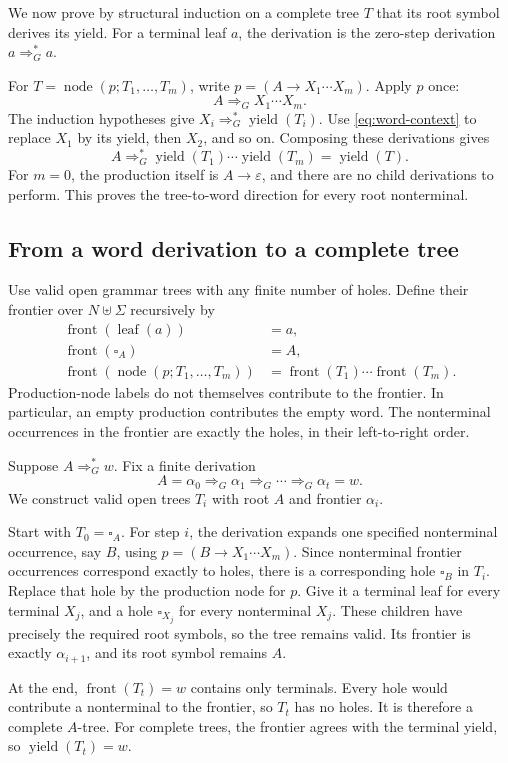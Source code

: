 \documentclass[11pt,a4paper]{article}
\numberwithin{equation}{section}
\theoremstyle{plain}
\theoremstyle{definition}
\theoremstyle{remark}
\newcommand{\eps}{\varepsilon}
\newcommand{\yield}{\operatorname{yield}}
\newcommand{\front}{\operatorname{front}}
\newcommand{\hole}[1]{\square_{#1}}
\begin{document}
We now prove by structural induction on a complete tree $T$ that its root symbol derives its yield. For a terminal leaf $a$, the derivation is the zero-step derivation $a\Rightarrow_G^*a$.

For $T=\operatorname{node}(p;T_1,\ldots,T_m)$, write $p=(A\to X_1\cdots X_m)$. Apply $p$ once:
\[
A\Rightarrow_G X_1\cdots X_m.
\]
The induction hypotheses give $X_i\Rightarrow_G^*\yield(T_i)$. Use \eqref{eq:word-context} to replace $X_1$ by its yield, then $X_2$, and so on. Composing these derivations gives
\[
A\Rightarrow_G^*\yield(T_1)\cdots\yield(T_m)=\yield(T).
\]
For $m=0$, the production itself is $A\to\eps$, and there are no child derivations to perform. This proves the tree-to-word direction for every root nonterminal.

\subsection{From a word derivation to a complete tree}
Use valid open grammar trees with any finite number of holes. Define their frontier over $N\uplus\Sigma$ recursively by
\begin{align*}
\front(\operatorname{leaf}(a))&=a,\\
\front(\hole A)&=A,\\
\front(\operatorname{node}(p;T_1,\ldots,T_m))
 &=\front(T_1)\cdots\front(T_m).
\end{align*}
Production-node labels do not themselves contribute to the frontier. In particular, an empty production contributes the empty word. The nonterminal occurrences in the frontier are exactly the holes, in their left-to-right order.

Suppose $A\Rightarrow_G^*w$. Fix a finite derivation
\[
A=\alpha_0\Rightarrow_G\alpha_1\Rightarrow_G\cdots
\Rightarrow_G\alpha_t=w.
\]
We construct valid open trees $T_i$ with root $A$ and frontier $\alpha_i$.

Start with $T_0=\hole A$. For step $i$, the derivation expands one specified nonterminal occurrence, say $B$, using $p=(B\to X_1\cdots X_m)$. Since nonterminal frontier occurrences correspond exactly to holes, there is a corresponding hole $\hole B$ in $T_i$. Replace that hole by the production node for $p$. Give it a terminal leaf for every terminal $X_j$, and a hole $\hole{X_j}$ for every nonterminal $X_j$. These children have precisely the required root symbols, so the tree remains valid. Its frontier is exactly $\alpha_{i+1}$, and its root symbol remains $A$.

At the end, $\front(T_t)=w$ contains only terminals. Every hole would contribute a nonterminal to the frontier, so $T_t$ has no holes. It is therefore a complete $A$-tree. For complete trees, the frontier agrees with the terminal yield, so $\yield(T_t)=w$.
\end{document}
